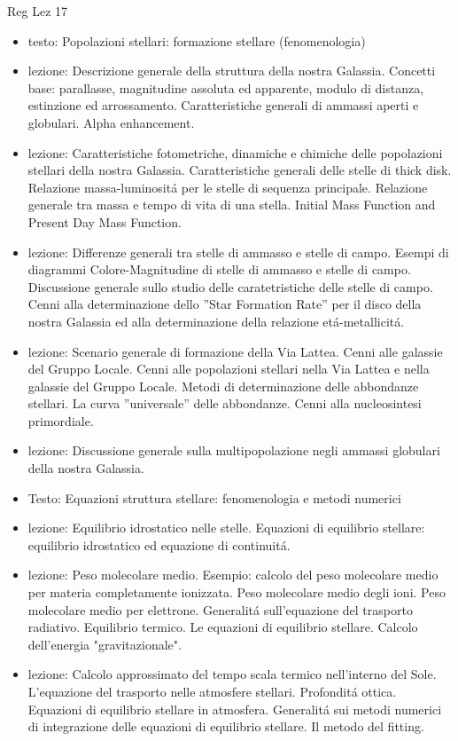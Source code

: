 \begin{frame}[allowframebreaks]{Reg Lez 17}
\begin{itemize}
\item testo: Popolazioni stellari: formazione stellare (fenomenologia)
\item lezione: Descrizione generale della struttura della nostra Galassia. Concetti base: parallasse, magnitudine assoluta ed apparente, modulo di distanza, estinzione ed arrossamento. Caratteristiche generali di ammassi aperti e globulari. Alpha enhancement.
\item lezione: Caratteristiche fotometriche, dinamiche e chimiche delle popolazioni stellari della nostra Galassia. Caratteristiche generali delle stelle di thick disk. Relazione massa-luminosit\'a per le stelle di sequenza principale. Relazione generale tra massa e tempo di vita di una stella. Initial Mass Function and Present Day Mass Function.
\item lezione: Differenze generali tra stelle di ammasso e stelle di campo. Esempi di diagrammi Colore-Magnitudine di stelle di ammasso e stelle di campo. Discussione generale sullo studio delle caratetristiche delle stelle di campo. Cenni alla determinazione dello ''Star Formation Rate'' per il disco della nostra Galassia ed alla determinazione della relazione et\'a-metallicit\'a. 
\item lezione: Scenario generale di formazione della Via Lattea. Cenni alle galassie del Gruppo Locale. Cenni alle popolazioni stellari nella Via Lattea e nella galassie del Gruppo Locale. Metodi di determinazione delle abbondanze stellari. La curva ''universale'' delle abbondanze. Cenni alla nucleosintesi primordiale.
\item lezione: Discussione generale sulla multipopolazione negli ammassi globulari della nostra Galassia. 
\item Testo: Equazioni struttura stellare: fenomenologia e metodi numerici
\item lezione: Equilibrio idrostatico nelle stelle. Equazioni di equilibrio stellare: equilibrio idrostatico ed equazione di continuit\'a.
\item lezione: Peso molecolare medio. Esempio: calcolo del peso molecolare medio per materia completamente ionizzata. Peso molecolare medio degli ioni. Peso molecolare medio per elettrone. Generalit\'a sull'equazione del trasporto radiativo. Equilibrio termico. Le equazioni di equilibrio stellare. Calcolo dell'energia "gravitazionale".
\item lezione: Calcolo approssimato del tempo scala termico nell'interno del Sole. L'equazione del trasporto nelle atmosfere stellari. Profondit\'a ottica. Equazioni di equilibrio stellare in atmosfera. Generalit\'a sui metodi numerici di integrazione delle equazioni di equilibrio stellare. Il metodo del fitting.

\end{itemize}
\end{frame}
